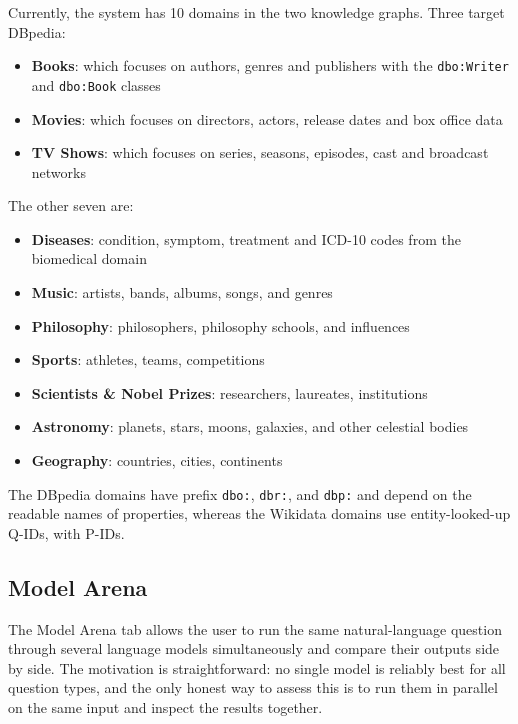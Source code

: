 \documentclass[11pt,a4paper]{article}
\begin{document}
Currently, the system has 10 domains in the two knowledge graphs. Three target DBpedia:

\begin{itemize}
    \item \textbf{Books}: which focuses on authors, genres and publishers with the \texttt{dbo:Writer} and \texttt{dbo:Book} classes
    \item \textbf{Movies}: which focuses on directors, actors, release dates and box office data
    \item \textbf{TV Shows}: which focuses on series, seasons, episodes, cast and broadcast networks
\end{itemize}

The other seven are:

\begin{itemize}
    \item \textbf{Diseases}: condition, symptom, treatment and ICD-10 codes from the biomedical domain
    \item \textbf{Music}: artists, bands, albums, songs, and genres
    \item \textbf{Philosophy}: philosophers, philosophy schools, and influences
    \item \textbf{Sports}: athletes, teams, competitions
    \item \textbf{Scientists \& Nobel Prizes}: researchers, laureates, institutions
    \item \textbf{Astronomy}: planets, stars, moons, galaxies, and other celestial bodies
    \item \textbf{Geography}: countries, cities, continents
\end{itemize}

The DBpedia domains \cite{auer2007dbpedia} have prefix \texttt{dbo:}, \texttt{dbr:}, and \texttt{dbp:} and depend on the readable names of properties, whereas the Wikidata domains \cite{vrandecic2014wikidata} use entity-looked-up Q-IDs, with P-IDs.

\subsection{Model Arena}
\label{sec:arena}

The Model Arena tab allows the user to run the same natural-language question through several language models simultaneously and compare their outputs side by side. The motivation is straightforward: no single model is reliably best for all question types, and the only honest way to assess this is to run them in parallel on the same input and inspect the results together.
\end{document}
